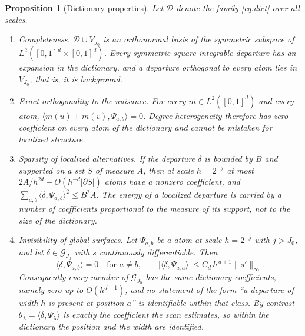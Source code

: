 \documentclass[11pt]{article}
\newtheorem{proposition}[theorem]{Proposition}
\theoremstyle{definition}
\newcommand{\1}{\mathbf 1}\newcommand{\op}{\operatorname}
\begin{document}
\begin{proposition}[Dictionary properties]                  \label{prop:dict}
Let $\mathcal D$ denote the family \eqref{eq:dict} over all scales.
\begin{enumerate}[label=\textup{(\roman*)},leftmargin=*]
\item \textup{Completeness.}  $\mathcal D\cup V_{J_0}$ is an orthonormal basis
of the symmetric subspace of $L^2([0,1]^d\times[0,1]^d)$.  Every symmetric
square-integrable departure has an expansion in the dictionary, and a departure
orthogonal to every atom lies in $V_{J_0}$, that is, it is background.
\item \textup{Exact orthogonality to the nuisance.}  For every
$m\in L^2([0,1]^d)$ and every atom, $\langle m(u)+m(v),\Psi_{a,b}\rangle=0$.
Degree heterogeneity therefore has zero coefficient on every atom of the
dictionary and cannot be mistaken for localized structure.
\item \textup{Sparsity of localized alternatives.}  If the departure $\delta$
is bounded by $B$ and supported on a set $S$ of measure $A$, then at scale
$h=2^{-j}$ at most $2A/h^{2d}+O(h^{-d}|\partial S|)$ atoms have a nonzero
coefficient, and $\sum_{a,b}\langle\delta,\Psi_{a,b}\rangle^2\le B^2A$.  The
energy of a localized departure is carried by a number of coefficients
proportional to the measure of its support, not to the size of the dictionary.
\item \textup{Invisibility of global surfaces.}  Let $\Psi_{a,b}$ be a atom at scale $h=2^{-j}$ with $j>J_0$, and
let $\delta\in\mathcal G_{J_0}$ with $s$ continuously differentiable.  Then
\[
\langle\delta,\Psi_{a,b}\rangle=0\quad\text{for }a\ne b,
\qquad
\bigl|\langle\delta,\Psi_{a,a}\rangle\bigr|\le C_d\,h^{\,d+1}\|s'\|_\infty .
\]
Consequently every member of $\mathcal G_{J_0}$ has the same dictionary
coefficients, namely zero up to $O(h^{d+1})$, and no statement of the form
``a departure of width $h$ is present at position $a$'' is identifiable within
that class.  By contrast $\theta_\lambda=\langle\delta,\Psi_\lambda\rangle$ is
exactly the coefficient the scan estimates, so within the dictionary the
position and the width are identified.
\end{enumerate}
\end{proposition}
\end{document}
